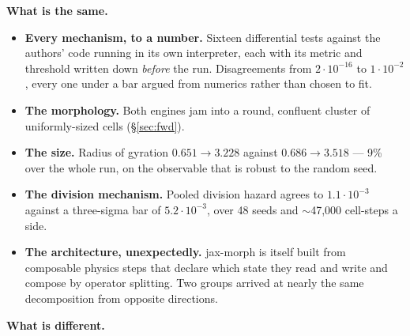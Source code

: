 \documentclass[11pt,a4paper]{article}
\begin{document}
\textbf{What is the same.}

\begin{itemize}
\item \textbf{Every mechanism, to a number.} Sixteen differential tests against the authors' code
running in its own interpreter, each with its metric and threshold written down \emph{before} the
run. Disagreements from $2{\cdot}10^{-16}$ to $1{\cdot}10^{-2}$, every one under a bar argued from
numerics rather than chosen to fit.
\item \textbf{The morphology.} Both engines jam into a round, confluent cluster of uniformly-sized
cells (\S\ref{sec:fwd}).
\item \textbf{The size.} Radius of gyration $0.651 \to 3.228$ against $0.686 \to 3.518$ --- 9\%
over the whole run, on the observable that is robust to the random seed.
\item \textbf{The division mechanism.} Pooled division hazard agrees to $1.1{\cdot}10^{-3}$
against a three-sigma bar of $5.2{\cdot}10^{-3}$, over 48 seeds and $\sim$47{,}000 cell-steps a
side.
\item \textbf{The architecture, unexpectedly.} jax-morph is itself built from composable physics
steps that declare which state they read and write and compose by operator splitting. Two groups
arrived at nearly the same decomposition from opposite directions.
\end{itemize}

\textbf{What is different.}
\end{document}
